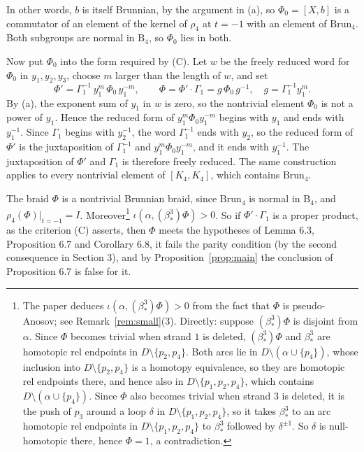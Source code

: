 \documentclass[11pt]{amsart}
\theoremstyle{remark}
\newcommand{\B}{\mathrm{B}}
\newcommand{\Brun}{\mathrm{Brun}}
\newcommand{\bs}{\beta^3_*}
\newcommand{\at}{\big|_{t=-1}}
\begin{document}
In other words, $b$ is itself Brunnian, by the argument in (a), so $\Phi_0=[X,b]$ is a commutator of an element of the kernel of $\rho_4$ at $t=-1$ with an element of $\Brun_4$. Both subgroups are normal in $\B_4$, so $\Phi_0$ lies in both.

Now put $\Phi_0$ into the form required by (C). Let $w$ be the freely reduced word for $\Phi_0$ in $y_1,y_2,y_3$, choose $m$ larger than the length of $w$, and set
\[
\Phi'=\Gamma_1^{-1}\,y_1^{m}\,\Phi_0\,y_1^{-m},\qquad \Phi=\Phi'\cdot\Gamma_1=g\,\Phi_0\,g^{-1},\quad g=\Gamma_1^{-1}y_1^{m}.
\]
By (a), the exponent sum of $y_1$ in $w$ is zero, so the nontrivial element $\Phi_0$ is not a power of $y_1$. Hence the reduced form of $y_1^m\Phi_0y_1^{-m}$ begins with $y_1$ and ends with $y_1^{-1}$. Since $\Gamma_1$ begins with $y_2^{-1}$, the word $\Gamma_1^{-1}$ ends with $y_2$, so the reduced form of $\Phi'$ is the juxtaposition of $\Gamma_1^{-1}$ and $y_1^m\Phi_0y_1^{-m}$, and it ends with $y_1^{-1}$. The juxtaposition of $\Phi'$ and $\Gamma_1$ is therefore freely reduced. The same construction applies to every nontrivial element of $[K_4,K_4]$, which contains $\Brun_4$.

The braid $\Phi$ is a nontrivial Brunnian braid, since $\Brun_4$ is normal in $\B_4$, and $\rho_4(\Phi)\at=I$. Moreover\footnote{The paper deduces $\iota(\alpha,(\bs)\Phi)>0$ from the fact that $\Phi$ is pseudo-Anosov; see Remark~\ref{rem:small}(3). Directly: suppose $(\bs)\Phi$ is disjoint from $\alpha$. Since $\Phi$ becomes trivial when strand $1$ is deleted, $(\bs)\Phi$ and $\bs$ are homotopic rel endpoints in $D\setminus\{p_2,p_4\}$. Both arcs lie in $D\setminus(\alpha\cup\{p_4\})$, whose inclusion into $D\setminus\{p_2,p_4\}$ is a homotopy equivalence, so they are homotopic rel endpoints there, and hence also in $D\setminus\{p_1,p_2,p_4\}$, which contains $D\setminus(\alpha\cup\{p_4\})$. Since $\Phi$ also becomes trivial when strand $3$ is deleted, it is the push of $p_3$ around a loop $\delta$ in $D\setminus\{p_1,p_2,p_4\}$, so it takes $\bs$ to an arc homotopic rel endpoints in $D\setminus\{p_1,p_2,p_4\}$ to $\bs$ followed by $\delta^{\pm1}$. So $\delta$ is null-homotopic there, hence $\Phi=1$, a contradiction.} $\iota(\alpha,(\bs)\Phi)>0$. So if $\Phi'\cdot\Gamma_1$ is a proper product, as the criterion (C) asserts, then $\Phi$ meets the hypotheses of Lemma 6.3, Proposition 6.7 and Corollary 6.8, it fails the parity condition (by the second consequence in Section 3), and by Proposition~\ref{prop:main} the conclusion of Proposition 6.7 is false for it.
\end{document}
